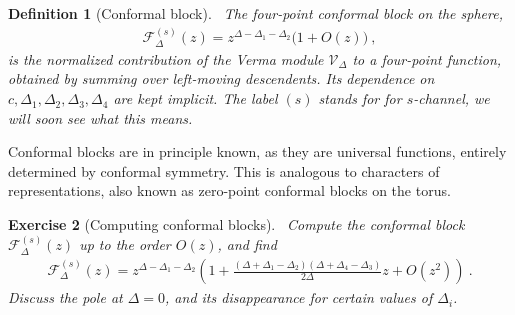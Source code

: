 \documentclass[12pt, a4paper]{article}
\theoremstyle{break}
\newtheorem{exo}{Exercise}[section]
\newtheorem{defn}[exo]{Definition}
\begin{document}
\begin{defn}[Conformal block]
 ~\label{def:block}
 The four-point conformal block on the sphere,
 \begin{align}
  \mathcal{F}^{(s)}_\Delta(z) = z^{\Delta-\Delta_1-\Delta_2}\Big( 1 + O(z) \Big)\ ,
  \label{eq:gsd}
 \end{align}
is the normalized contribution of the Verma module $\mathcal V_\Delta$ to a four-point function, obtained by summing over left-moving descendents. Its dependence on $c,\Delta_1,\Delta_2,\Delta_3,\Delta_4$ are kept implicit. The label $(s)$ stands for for $s$-channel, we will soon see what this means.
\end{defn}
Conformal blocks are in principle known, as they are universal functions, entirely determined by conformal symmetry. This is analogous to characters of representations, also known as zero-point conformal blocks on the torus.

\begin{exo}[Computing conformal blocks]
 ~\label{exo:block}
 Compute the conformal block $ \mathcal{F}^{(s)}_\Delta(z)$ up to the order $O(z)$, and find
 \begin{align}
  \mathcal{F}^{(s)}_\Delta(z) = z^{\Delta-\Delta_1-\Delta_2}\left( 1 + \frac{(\Delta+\Delta_1-\Delta_2)(\Delta+\Delta_4-\Delta_3)}{2\Delta}z + O(z^2) \right)\ .
 \end{align}
 Discuss the pole at $\Delta=0$, and its disappearance for certain values of $\Delta_i$.
\end{exo}
\end{document}
